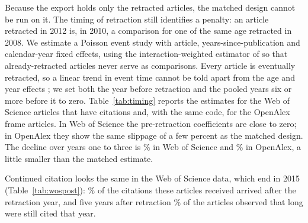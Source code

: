 \documentclass[11pt,letterpaper]{article}
\begin{document}
Because the export holds only the retracted articles, the matched design cannot be run on it. The timing of retraction still identifies a penalty: an article retracted in 2012 is, in 2010, a comparison for one of the same age retracted in 2008. We estimate a Poisson event study with article, years-since-publication and calendar-year fixed effects, using the interaction-weighted estimator of \citet{sunabraham2021} so that already-retracted articles never serve as comparisons. Every article is eventually retracted, so a linear trend in event time cannot be told apart from the age and year effects \citep{borusyak2024}; we set both the year before retraction and the pooled years six or more before it to zero. Table~\ref{tab:timing} reports the estimates for the \TimingWosArticles{} Web of Science articles that have citations and, with the same code, for the \TimingOpenAlexArticles{} OpenAlex frame articles. In Web of Science the pre-retraction coefficients are close to zero; in OpenAlex they show the same slippage of a few percent as the matched design. The decline over years one to three is \TimingWosAverage\% \TimingWosInterval{} in Web of Science and \TimingOpenAlexAverage\% \TimingOpenAlexInterval{} in OpenAlex, a little smaller than the matched estimate.

\begin{table}[H]
\centering
\caption{Change in citations to retracted articles by years from retraction, estimated from the timing of retraction among retracted articles only. Poisson event study with article, years-since-publication and calendar-year fixed effects, Sun--Abraham interaction weights; the year before retraction and the years six or more before it are the reference. The last row is the cohort-weighted average of years one to three. Intervals are 95\%, clustered by article.}
\label{tab:timing}
\end{table}

Continued citation looks the same in the Web of Science data, which end in 2015 (Table~\ref{tab:wospost}): \WosPostShare\% of the citations these articles received arrived after the retraction year, and five years after retraction \WosCitedAtFive\% of the \WosArticlesAtFive{} articles observed that long were still cited that year.

\begin{table}[H]
\centering
\caption{Citations to retracted articles in the 2016 Web of Science sample by years after the year of the retraction notice. Each row covers the articles whose notice was at least that many years before 2015, the last complete year of the export.}
\label{tab:wospost}
\end{table}
\end{document}
